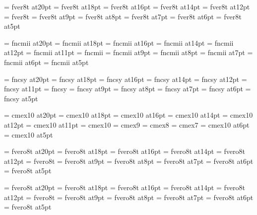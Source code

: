 
\font\twentyrm=     fver8t at20pt
\font\eighteenrm=   fver8t at18pt
\font\sixteenrm=    fver8t at16pt
\font\fourteenrm=   fver8t at14pt
\font\twelverm=     fver8t at12pt
\font\tenrm=        fver8t
\font\ninerm=       fver8t at9pt
\font\eightrm=      fver8t at8pt
\font\sevenrm=      fver8t at7pt
\font\sixrm=        fver8t at6pt
\font\fiverm=       fver8t at5pt

\font\twentyi=      fncmii at20pt
\font\eighteeni=    fncmii at18pt
\font\sixteeni=     fncmii at16pt
\font\fourteeni=    fncmii at14pt
\font\twelvei=      fncmii at12pt
\font\eleveni=      fncmii at11pt
\font\teni=         fncmii
\font\ninei=        fncmii at9pt
\font\eighti=       fncmii at8pt
\font\seveni=       fncmii at7pt
\font\sixi=         fncmii at6pt
\font\fivei=        fncmii at5pt

\font\twentysy=     fncsy at20pt
\font\eighteensy=   fncsy at18pt
\font\sixteensy=    fncsy at16pt
\font\fourteensy=   fncsy at14pt
\font\twelvesy=     fncsy at12pt
\font\elevensy=     fncsy at11pt
\font\tensy=        fncsy
\font\ninesy=       fncsy at9pt
\font\eightsy=      fncsy at8pt
\font\sevensy=      fncsy at7pt
\font\sixsy=        fncsy at6pt
\font\fivesy=       fncsy at5pt

\font\twentyex=     cmex10 at20pt
\font\eighteenex=   cmex10 at18pt
\font\sixteenex=    cmex10 at16pt
\font\fourteenex=   cmex10 at14pt
\font\twelveex=     cmex10 at12pt
\font\elevenex=     cmex10 at11pt
\font\tenex=        cmex10
\font\nineex=       cmex9
\font\eightex=      cmex8
\font\sevenex=      cmex7
\font\sixex=        cmex10 at6pt
\font\fiveex=       cmex10 at5pt


\font\twentyit=     fvero8t at20pt
\font\eighteenit=   fvero8t at18pt
\font\sixteenit=    fvero8t at16pt
\font\fourteenit=   fvero8t at14pt
\font\twelveit=     fvero8t at12pt
\font\tenit=        fvero8t
\font\nineit=       fvero8t at9pt
\font\eightit=      fvero8t at8pt
\font\sevenit=      fvero8t at7pt
\font\sixit=        fvero8t at6pt
\font\fiveit=       fvero8t at5pt

\font\twentysl=     fvero8t at20pt
\font\eighteensl=   fvero8t at18pt
\font\sixteensl=    fvero8t at16pt
\font\fourteensl=   fvero8t at14pt
\font\twelvesl=     fvero8t at12pt
\font\tensl=        fvero8t
\font\ninesl=       fvero8t at9pt
\font\eightsl=      fvero8t at8pt
\font\sevensl=      fvero8t at7pt
\font\sixsl=        fvero8t at6pt
\font\fivesl=       fvero8t at5pt


